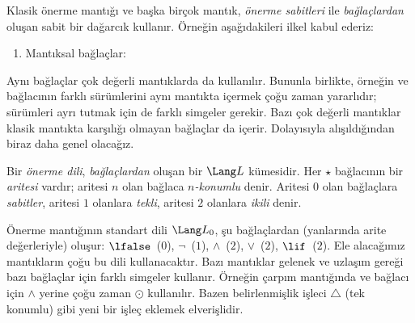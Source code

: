 



Klasik önerme mantığı ve başka birçok mantık, \emph{önerme sabitleri} ile
\emph{bağlaçlardan} oluşan sabit bir dağarcık kullanır. Örneğin
aşağıdakileri ilkel kabul ederiz:
\begin{enumerate}
\item Mantıksal bağlaçlar:
  \startycommalist
\end{enumerate}

Aynı bağlaçlar çok değerli mantıklarda da kullanılır. Bununla birlikte,
örneğin ve bağlacının farklı sürümlerini aynı mantıkta içermek çoğu zaman
yararlıdır; sürümleri ayrı tutmak için de farklı simgeler gerekir. Bazı çok
değerli mantıklar klasik mantıkta karşılığı olmayan bağlaçlar da içerir.
Dolayısıyla alışıldığından biraz daha genel olacağız.

\begin{defn}
Bir \emph{önerme dili}, \emph{bağlaçlardan} oluşan bir $\Lang L$ kümesidir.
Her $\star$ bağlacının bir \emph{aritesi} vardır; aritesi $n$ olan bağlaca
\emph{$n$-konumlu} denir. Aritesi $0$ olan bağlaçlara \emph{sabitler},
aritesi $1$ olanlara \emph{tekli}, aritesi $2$ olanlara \emph{ikili} denir.
\end{defn}

\begin{ex}
Önerme mantığının standart dili $\Lang L_0$, şu bağlaçlardan (yanlarında
arite değerleriyle) oluşur: $\lfalse$~($0$), $\lnot$~($1$),
$\land$~($2$), $\lor$~($2$), $\lif$~($2$). Ele alacağımız mantıkların çoğu
bu dili kullanacaktır. Bazı mantıklar gelenek ve uzlaşım gereği bazı
bağlaçlar için farklı simgeler kullanır. Örneğin çarpım mantığında ve bağlacı
için $\land$ yerine çoğu zaman $\odot$ kullanılır. Bazen belirlenmişlik
işleci $\triangle$ (tek konumlu) gibi yeni bir işleç eklemek elverişlidir.
\end{ex}

